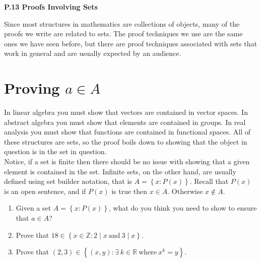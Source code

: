 \documentclass[12 pt]{article}
\newcommand{\R}{\mathbb{R}}
\newcommand{\Z}{\mathbb{Z}}
\newcommand{\set}[1]{\left\{#1\right\}}
\newcommand{\divides}{\! \mid \!}
\theoremstyle{definition}
\theoremstyle{plain}
\theoremstyle{mytheorem}
\theoremstyle{myexample}
\theoremstyle{mydefinition}
\begin{document}
\begin{center}
\textbf{P.13 Proofs Involving Sets}
\end{center}

Since most structures in mathematics are collections of objects, many of the proofs we write are related to sets.  The proof techniques we use are the same ones we have seen before, but there are proof techniques associated with sets that work in general and are usually expected by an audience.
\begin{center}
\end{center}

\section{Proving $a \in A$}

In linear algebra you must show that vectors are contained in vector spaces.  In abstract algebra you must show that elements are contained in groups.  In real analysis you must show that functions are contained in functional spaces.  All of these structures are sets, so the proof boils down to showing that the object in question is in the set in question.\\

Notice, if a set is finite then there should be no issue with showing that a given element is contained in the set.  Infinite sets, on the other hand, are usually defined using set builder notation, that is $A = \set{x : P(x)}$.  Recall that $P(x)$ is an open sentence, and if $P(x)$ is true then $x \in A$. Otherwise $x \notin A$.
\begin{enumerate}
\item Given a set $A=\set{x : P(x)}$, what do you think you need to show to ensure that $a \in A$?
\vspace{1.5in}
\item Prove that $18 \in \set{x \in \Z : 2 \divides x \ \mbox{and} \ 3\divides x}.$

\vspace{2in}

\item Prove that $(2,3) \in \set{(x,y): \exists\ k \in \R \ \mbox{where} \ x^k=y}$.

\vspace{2in}

\end{enumerate}
\end{document}
